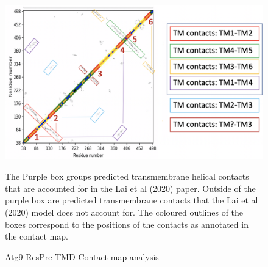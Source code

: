 \begin{figure}[th!]
    \centering
    \includegraphics[width=\textwidth]{Modelling of Atg9/respred_cmap_anal.png}
    \caption{Atg9 ResPre TMD Contact map analysis}
    \label{fig:respr_anal}
    \small
    The Purple box groups predicted transmembrane helical contacts that are accounted for in the Lai et al (2020) paper.  Outside of the purple box are predicted transmembrane contacts that the Lai et al (2020) model does not account for. The coloured outlines of the boxes correspond to the positions of the contacts as annotated in the contact map.
\end{figure}
